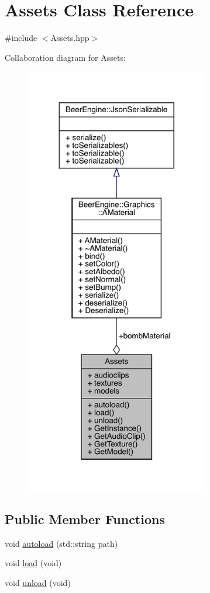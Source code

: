 \hypertarget{class_assets}{}\section{Assets Class Reference}
\label{class_assets}


{\ttfamily \#include $<$Assets.\+hpp$>$}



Collaboration diagram for Assets\+:\nopagebreak
\begin{figure}[H]
\begin{center}
\leavevmode
\includegraphics[width=227pt]{class_assets__coll__graph}
\end{center}
\end{figure}
\subsection*{Public Member Functions}
\begin{DoxyCompactItemize}
\item 
void \mbox{\hyperlink{class_assets_a4e848364b8e24434ec5be20c28106dbd}{autoload}} (std\+::string path)
\item 
void \mbox{\hyperlink{class_assets_a39f25e7a1853ac52ca5fcfdb676ace04}{load}} (void)
\item 
void \mbox{\hyperlink{class_assets_a7c382091adff219150cbd067d646fe16}{unload}} (void)
\end{DoxyCompactItemize}
